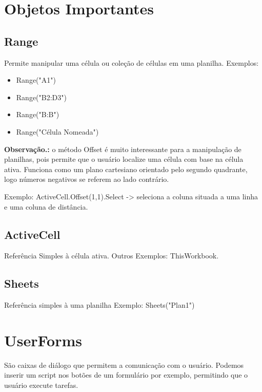 \documentclass[12pt, a4paper]{article}
\begin{document}
\section{Objetos Importantes}
    \subsection{Range}
        Permite manipular uma célula ou coleção de células em uma planilha.
        Exemplos:
        \begin{itemize}
            \item Range("A1")
            \item Range("B2:D3")
            \item Range("B:B")
            \item Range("Célula Nomeada")
        \end{itemize}
        
        \textbf{Observação.:} o método Offset é muito interessante para a manipulação de planilhas, pois permite que o usuário localize uma célula com base na célula ativa. Funciona como um plano cartesiano orientado pelo segundo quadrante, logo números negativos se referem ao lado contrário.
        
        Exemplo: ActiveCell.Offset(1,1).Select -> seleciona a coluna situada a uma linha e uma coluna de distância. 
        
    \subsection{ActiveCell}
        Referência Simples à célula ativa. Outros Exemplos: ThisWorkbook. 
    \subsection{Sheets}
        Referência simples à uma planilha
        Exemplo:
            Sheets("Plan1")



\section{UserForms}
    São caixas de diálogo que permitem a comunicação com o usuário. Podemos inserir um script nos botões de um formulário por exemplo, permitindo que o usuário execute tarefas. 
\end{document}
